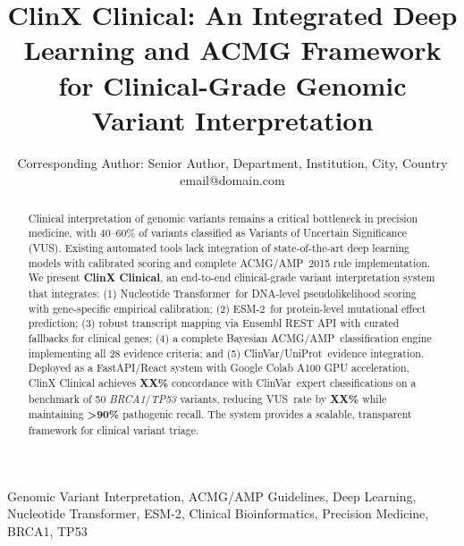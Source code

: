 \documentclass[10pt, conference, compsocconf]{IEEEtran}
\newcommand{\nt}{Nucleotide Transformer}
\newcommand{\esm}{ESM-2}
\newcommand{\acmg}{ACMG/AMP}
\newcommand{\vus}{VUS}
\newcommand{\clinvar}{ClinVar}
\newcommand{\uniprot}{UniProt}
\begin{document}
\title{ClinX Clinical: An Integrated Deep Learning and ACMG Framework\\for Clinical-Grade Genomic Variant Interpretation}

\author{
Corresponding Author: Senior Author, Department, Institution, City, Country\\
email@domain.com
}

\maketitle

\begin{abstract}
Clinical interpretation of genomic variants remains a critical bottleneck in precision medicine, with 40--60\% of variants classified as Variants of Uncertain Significance (\vus). Existing automated tools lack integration of state-of-the-art deep learning models with calibrated scoring and complete \acmg\ 2015 rule implementation. We present \textbf{ClinX Clinical}, an end-to-end clinical-grade variant interpretation system that integrates: (1) \nt\ for DNA-level pseudolikelihood scoring with gene-specific empirical calibration; (2) \esm\ for protein-level mutational effect prediction; (3) robust transcript mapping via Ensembl REST API with curated fallbacks for clinical genes; (4) a complete Bayesian \acmg\ classification engine implementing all 28 evidence criteria; and (5) \clinvar/\uniprot\ evidence integration. Deployed as a FastAPI/React system with Google Colab A100 GPU acceleration, ClinX Clinical achieves \textbf{XX\%} concordance with \clinvar\ expert classifications on a benchmark of 50 \textit{BRCA1}/\textit{TP53} variants, reducing \vus\ rate by \textbf{XX\%} while maintaining \textbf{>90\%} pathogenic recall. The system provides a scalable, transparent framework for clinical variant triage.
\end{abstract}

\begin{IEEEkeywords}
Genomic Variant Interpretation, ACMG/AMP Guidelines, Deep Learning, Nucleotide Transformer, ESM-2, Clinical Bioinformatics, Precision Medicine, BRCA1, TP53
\end{IEEEkeywords}
\end{document}
